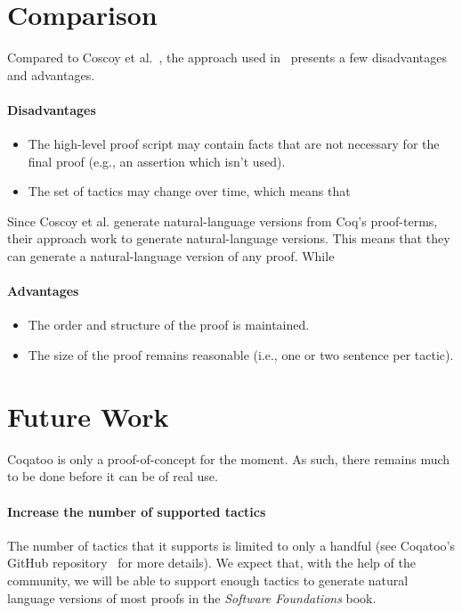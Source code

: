 \documentclass[sigplan,screen,9pt]{acmart}
\begin{document}
\pagebreak
\section{Comparison}
Compared to Coscoy et al.~\cite{DBLP:conf/tlca/CoscoyKT95,DBLP:conf/lacl/Coscoy96}, the approach used in \coqatoo\ presents a few disadvantages and advantages.
\paragraph{Disadvantages}
\begin{itemize}
  \item{The high-level proof script may contain facts that are not necessary for the final proof (e.g., an assertion which isn't used).}
  \item{The set of tactics may change over time, which means that \coqatoo\ }
\end{itemize}
Since Coscoy et al. generate natural-language versions from Coq's proof-terms, their approach work  to generate natural-language versions. This means that they can generate a natural-language version of any proof. While \coqatoo\ 

\paragraph{Advantages}
\begin{itemize}
  \item{The order and structure of the proof is maintained.}
  \item{The size of the proof remains reasonable (i.e., one or two sentence per tactic).}
\end{itemize}

\section{Future Work}
Coqatoo is only a proof-of-concept for the moment. As such, there remains much to be done before it can be of real use. 

\paragraph{Increase the number of supported tactics}
The number of tactics that it supports is limited to only a handful (see Coqatoo's GitHub repository~\cite{Coqatoo} for more details). We expect that, with the help of the community, we will be able to support enough tactics to generate natural language versions of most proofs in the \emph{Software Foundations} book.
\end{document}
